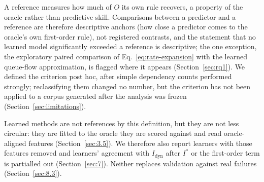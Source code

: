 A reference measures how much of $O$ its own rule recovers, a property of the oracle rather than predictive skill. Comparisons between a predictor and a reference are therefore descriptive anchors (how close a predictor comes to the oracle's own first-order rule), not registered contrasts, and the statement that no learned model significantly exceeded a reference is descriptive; the one exception, the exploratory paired comparison of Eq.~\eqref{eq:rate-expansion} with the learned queue-flow approximation, is flagged where it appears (Section~\ref{sec:rq1}). We defined the criterion post hoc, after simple dependency counts performed strongly; reclassifying them changed no number, but the criterion has not been applied to a corpus generated after the analysis was frozen (Section~\ref{sec:limitations}).

Learned methods are not references by this definition, but they are not less circular: they are fitted to the oracle they are scored against and read oracle-aligned features (Section~\ref{sec:3.5}). We therefore also report learners with those features removed and learners' agreement with $I_{\text{dyn}}$ after $I^*$ or the first-order term is partialled out (Section~\ref{sec:7}). Neither replaces validation against real failures (Section~\ref{sec:8.3}).
